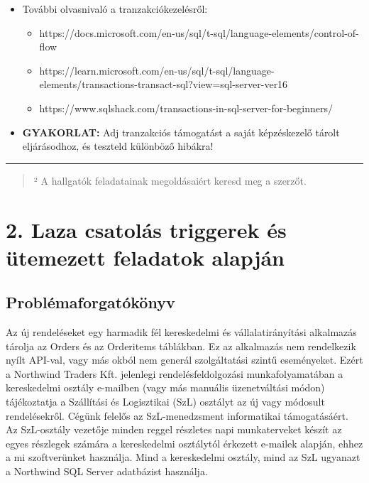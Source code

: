 \documentclass[
  magyar,
]{article}
\providecommand{\tightlist}{%
  \setlength{\itemsep}{0pt}\setlength{\parskip}{0pt}}
\begin{document}
\begin{itemize}
\item
  További olvasnivaló a tranzakciókezelésről:

  \begin{itemize}
  \tightlist
  \item
    https://docs.microsoft.com/en-us/sql/t-sql/language-elements/control-of-flow
  \item
    https://learn.microsoft.com/en-us/sql/t-sql/language-elements/transactions-transact-sql?view=sql-server-ver16
  \item
    https://www.sqlshack.com/transactions-in-sql-server-for-beginners/
  \end{itemize}
\item
  \textbf{GYAKORLAT:} Adj tranzakciós támogatást a saját képzéskezelő
  tárolt eljárásodhoz, és teszteld különböző hibákra!
\end{itemize}

\begin{center}\rule{0.5\linewidth}{0.5pt}\end{center}

\begin{quote}
² A hallgatók feladatainak megoldásaiért keresd meg a szerzőt.
\end{quote}

\section{2. Laza csatolás triggerek és ütemezett feladatok
alapján}\label{laza-csatoluxe1s-triggerek-uxe9s-uxfctemezett-feladatok-alapjuxe1n}

\subsection{Problémaforgatókönyv}\label{probluxe9maforgatuxf3kuxf6nyv}

Az új rendeléseket egy harmadik fél kereskedelmi és vállalatirányítási
alkalmazás tárolja az Orders és az Orderitems táblákban. Ez az
alkalmazás nem rendelkezik nyílt API-val, vagy más okból nem generál
szolgáltatási szintű eseményeket. Ezért a Northwind Traders Kft.
jelenlegi rendelésfeldolgozási munkafolyamatában a kereskedelmi osztály
e-mailben (vagy más manuális üzenetváltási módon) tájékoztatja a
Szállítási és Logisztikai (SzL) osztályt az új vagy módosult
rendelésekről. Cégünk felelős az SzL-menedzsment informatikai
támogatásáért. Az SzL-osztály vezetője minden reggel részletes napi
munkaterveket készít az egyes részlegek számára a kereskedelmi
osztálytól érkezett e-mailek alapján, ehhez a mi szoftverünket
használja. Mind a kereskedelmi osztály, mind az SzL ugyanazt a Northwind
SQL Server adatbázist használja.
\end{document}
